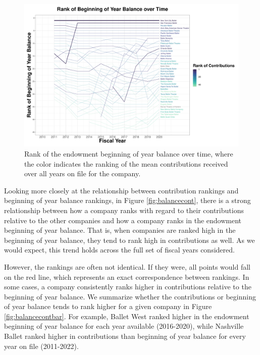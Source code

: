 \documentclass[Dance Data
Project,article,submit,moreauthors,pdftex]{mdpi}
\begin{document}
\begin{figure}[H]
\includegraphics[width=0.9\linewidth,]{../images/rank-endowments-color-contribution} \caption{\label{fig:rank-endowments-color-contribution}Rank of the endowment beginning of year balance over time, where the color indicates the ranking of the mean contributions received over all years on file for the company.}\label{fig:unnamed-chunk-3}
\end{figure}

Looking more closely at the relationship between contribution rankings
and beginning of year balance rankings, in Figure \ref{fig:balancecont},
there is a strong relationship between how a company ranks with regard
to their contributions relative to the other companies and how a company
ranks in the endowment beginning of year balance. That is, when
companies are ranked high in the beginning of year balance, they tend to
rank high in contributions as well. As we would expect, this trend holds
across the full set of fiscal years considered.

However, the rankings are often not identical. If they were, all points
would fall on the red line, which represents an exact correspondence
between rankings. In some cases, a company consistently ranks higher in
contributions relative to the beginning of year balance. We summarize
whether the contributions or beginning of year balance tends to rank
higher for a given company in Figure \ref{fig:balancecontbar}. For
example, Ballet West ranked higher in the endowment beginning of year
balance for each year available (2016-2020), while Nashville Ballet
ranked higher in contributions than beginning of year balance for every
year on file (2011-2022).
\end{document}
